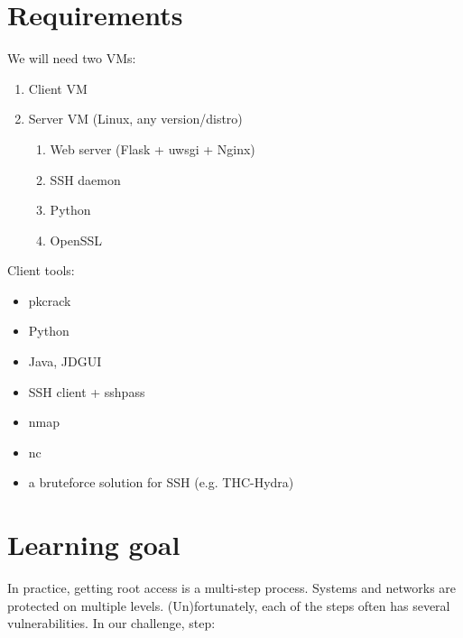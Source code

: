 \documentclass[a4paper]{article}
\begin{document}
\section{Requirements}

\noindent We will need two VMs:

\begin{enumerate}
  \item Client VM
  \item Server VM (Linux, any version/distro)
        \begin{enumerate}
          \item Web server (Flask + uwsgi + Nginx)
          \item SSH daemon
          \item Python
          \item OpenSSL
        \end{enumerate}
\end{enumerate}

\noindent Client tools:

\begin{itemize}
  \item pkcrack
  \item Python
  \item Java, JDGUI
  \item SSH client + sshpass
  \item nmap
  \item nc
  \item a bruteforce solution for SSH (e.g. THC-Hydra)
\end{itemize}

\section{Learning goal}

In practice, getting root access is a multi-step process. Systems and
networks are protected on multiple levels. (Un)fortunately, each of the
steps often has several vulnerabilities. In our challenge, step:
\end{document}
